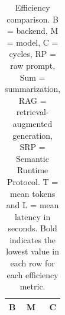 \begin{table}[t]
\centering
\setlength{\tabcolsep}{4pt}
\scriptsize
\begin{tabular}{llr}
\toprule
B & M & C \\
\midrule
\bottomrule
\end{tabular}
\caption{Efficiency comparison. B = backend, M = model, C = cycles, RP = raw prompt, Sum = summarization, RAG = retrieval-augmented generation, SRP = Semantic Runtime Protocol. T = mean tokens and L = mean latency in seconds. Bold indicates the lowest value in each row for each efficiency metric.}
\label{tab:srp-efficiency-table}
\end{table}
